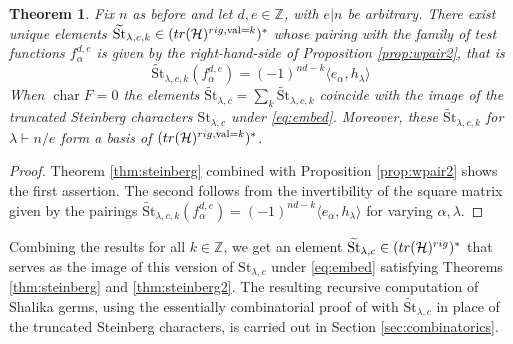 \documentclass{amsart}
\numberwithin{equation}{section}
\newtheorem{theorem}[lemma]{Theorem}%
\theoremstyle{definition}
\def\tr{{\rm tr}}
\def\val{\mathrm{val}}
\def\tilde{\widetilde}
\newcommand{\cH}{\mathcal{H}}
\newcommand{\Z}{{\mathbb Z}}
\newcommand{\St}{\mathrm{St}}
\DeclareMathOperator{\cchar}{\text{char}}
\begin{document}
\begin{theorem}
\label{thm:pseudo-steinberg}
Fix $n$ as before and let $d, e\in \Z$, with $e|n$ be arbitrary. There exist unique elements $\tilde{\St}_{\lambda,c,k}\in (\tr(\cH)^{rig,\val=k})^*$ whose pairing with the family of test functions $f_{\alpha}^{d,e}$ is given by the right-hand-side of Proposition \ref{prop:wpair2},
that is 
$$
\tilde{\St}_{\lambda,c,k}(f_{\alpha}^{d,e})=(-1)^{nd-k}\langle e_\alpha, h_\lambda\rangle
$$
When $\cchar F=0$ the elements $\tilde{\St}_{\lambda,c}=\sum_k \tilde{\St}_{\lambda,c,k}$ coincide with the image of the truncated Steinberg characters $\St_{\lambda,c}$ under \eqref{eq:embed}. Moreover, these $\tilde{\St}_{\lambda,c,k}$ for $\lambda\vdash n/e$ form a basis of $(\tr(\cH)^{rig,\val=k})^*$.
\end{theorem}
\begin{proof}
Theorem \ref{thm:steinberg} combined with Proposition \ref{prop:wpair2} shows the first assertion. The second follows from the invertibility of the square matrix given by the pairings $\tilde{\St}_{\lambda,c,k}(f_\alpha^{d,e})=(-1)^{nd-k}\langle e_\alpha,h_\lambda\rangle$ for varying $\alpha,\lambda$.
\end{proof}
Combining the results for all $k\in\Z$, we get an element $\tilde{\St}_{\lambda,c}\in(\tr(\cH)^{rig})^*$ that serves as the image of this version of $\St_{\lambda,c}$ under \eqref{eq:embed} satisfying Theorems \ref{thm:steinberg} and \ref{thm:steinberg2}. The resulting recursive computation of Shalika germs, using the essentially combinatorial proof of \cite[Lemme V 12]{W2} with $\tilde{\St}_{\lambda,c}$ in place of the truncated Steinberg characters, is carried out in Section \ref{sec:combinatorics}.



\end{document}

